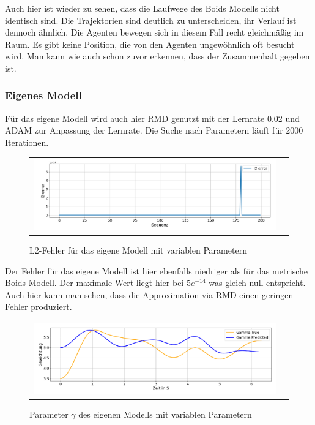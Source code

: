 Auch hier ist wieder zu sehen, dass die Laufwege des Boids Modells nicht identisch sind. Die Trajektorien sind deutlich zu unterscheiden, ihr Verlauf ist dennoch ähnlich. Die Agenten bewegen sich in diesem Fall recht gleichmäßig im Raum.
Es gibt keine Position, die von den Agenten ungewöhnlich oft besucht wird. Man kann wie auch schon zuvor erkennen, dass der Zusammenhalt gegeben ist.

\subsubsection{Eigenes Modell}

Für das eigene Modell wird auch hier RMD genutzt mit der Lernrate 0.02 und ADAM zur Anpassung der Lernrate.
Die Suche nach Parametern läuft für 2000 Iterationen.

\begin{figure}[H]
\centering
\begin{tabular}{cc}
\includegraphics[width=1.0\textwidth]{figures/Experimente/Parameter_variabel/PWD_l2.png} 
\end{tabular}
\caption{L2-Fehler für das eigene Modell mit variablen Parametern  \label{fig:PWD_PV_l2}}
\end{figure}

Der Fehler für das eigene Modell ist hier ebenfalls niedriger als für das metrische Boids Modell.
Der maximale Wert liegt hier bei $5e^{-14}$ was gleich null entspricht. Auch hier kann man sehen, dass die Approximation via RMD einen geringen Fehler produziert.
\begin{figure}[H]
\centering
\begin{tabular}{cc}
\includegraphics[width=1.0\textwidth]{figures/Experimente/Parameter_variabel/PWD_Gamma.png} 
\end{tabular}
\caption{Parameter $\gamma$ des eigenen Modells mit variablen Parametern \label{fig:PWD_PV_Gamma}}
\end{figure}

